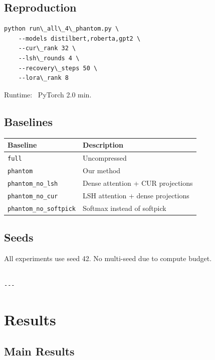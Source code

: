 \subsection{Reproduction}

\begin{lstlisting}
python run\_all\_4\_phantom.py \
    --models distilbert,roberta,gpt2 \
    --cur\_rank 32 \
    --lsh\_rounds 4 \
    --recovery\_steps 50 \
    --lora\_rank 8
\end{lstlisting}

Runtime: ~PyTorch 2.0 min.

\subsection{Baselines}

\begin{table}[H]
\centering
\small
\begin{tabular}{ll}
\toprule
\textbf{Baseline} & \textbf{Description} \\
\midrule
\texttt{full} & Uncompressed \\
\texttt{phantom} & Our method \\
\texttt{phantom\_no\_lsh} & Dense attention + CUR projections \\
\texttt{phantom\_no\_cur} & LSH attention + dense projections \\
\texttt{phantom\_no\_softpick} & Softmax instead of softpick \\
\bottomrule
\end{tabular}
\end{table}

\subsection{Seeds}

All experiments use seed 42. No multi-seed due to compute budget.
\begin{lstlisting}

---
\end{lstlisting}


\section{Results}

\subsection{Main Results}

